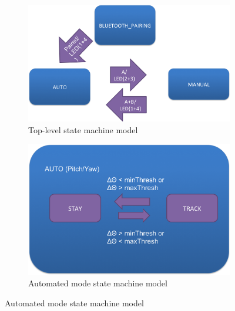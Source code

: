 \documentclass[conference, twocolumn]{IEEEtran}
\begin{document}
\begin{figure}
\begin{center}
    \begin{subfigure}[b]{0.7\linewidth}
    \begin{center}
    \includegraphics[width=1\linewidth]{../images/high_state}
    \caption{Top-level state machine model}
    \label{fig:high_state}
    \end{center}
    \end{subfigure}
    
    \vspace{0.05\linewidth}
    
    \begin{subfigure}[b]{0.7\linewidth}
    \begin{center}
    \includegraphics[width=1\linewidth]{../images/auto}
    \caption{Automated mode state machine model}
    \label{fig:auto_state}
    \end{center}
    \end{subfigure}
    

\end{center}
\end{figure}
\end{document}
